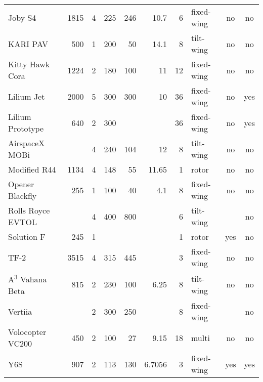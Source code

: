 \begin{table}[h]
\begin{tabular}{l|rrrrrrlcc}
Joby S4          & 1815          & 4   & 225               & 246            & 10.7             & 6     & fixed-wing    & no      & no     \\
KARI PAV          & 500           & 1   & 200               & 50             & 14.1             & 8     & tilt-wing     & no      & no     \\
Kitty Hawk Cora  & 1224          & 2   & 180               & 100            & 11               & 12    & fixed-wing    & no      & no     \\
Lilium Jet \footnotemark      & 2000          & 5   & 300               & 300            & 10               & 36    & fixed-wing    & no      & yes    \\
Lilium Prototype & 640           & 2   & 300               &                &                  & 36    & fixed-wing    & no      & yes    \\
AirspaceX MOBi             &               & 4   & 240               & 104            & 12               & 8     & tilt-wing     & no      & no     \\
Modified R44     & 1134          & 4   & 148               & 55             & 11.65            & 1     & rotor         & no      & no     \\
Opener Blackfly \footnotemark & 255           & 1   & 100               & 40             & 4.1              & 8     & fixed-wing    & no      & no     \\
Rolls Royce EVTOL         &               & 4   & 400               & 800            &                  & 6     & tilt-wing     &         & no     \\
Solution F       & 245           & 1   &                   &                &                  & 1     & rotor        & yes     & no     \\
TF-2             & 3515          & 4   & 315               & 445            &                  & 3     & fixed-wing    & no      & no     \\
A\textsuperscript{3} Vahana Beta      & 815           & 2   & 230               & 100            & 6.25             & 8     & tilt-wing     & no      & no     \\
Vertiia          &               & 2   & 300               & 250            &                  & 8     & fixed-wing    &         & no     \\
Volocopter VC200       & 450           & 2   & 100               & 27             & 9.15             & 18    & multi         & no      & no     \\
Y6S              & 907           & 2   & 113               & 130            & 6.7056           & 3     & fixed-wing    & yes     & yes   
\end{tabular}
\end{table}




